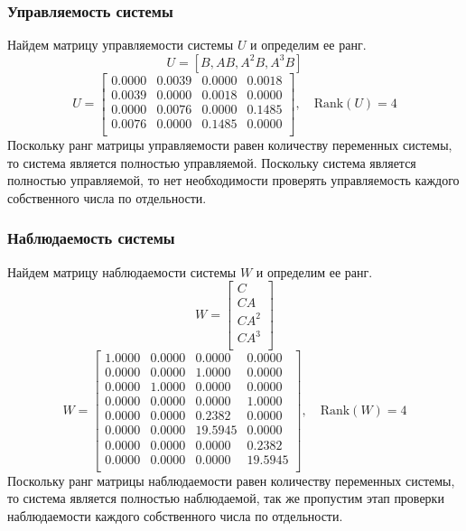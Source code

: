 \subsubsection{Управляемость системы}
Найдем матрицу управляемости системы $U$ и определим ее ранг. 
\begin{equation}
    U = [B, AB, A^2B, A^3B]
\end{equation}
\begin{equation}
    U = \begin{bmatrix}
    0.0000  & 0.0039  & 0.0000  & 0.0018 \\ 
    0.0039  & 0.0000  & 0.0018  & 0.0000 \\ 
    0.0000  & 0.0076  & 0.0000  & 0.1485 \\ 
    0.0076  & 0.0000  & 0.1485  & 0.0000 \\ 
    \end{bmatrix}, \quad \text{Rank}(U) = 4
    \label{eq:controlability_matrix}
\end{equation}
Поскольку ранг матрицы управляемости равен количеству переменных системы, то система является полностью управляемой. 
Поскольку система является полностью управляемой, то нет необходимости проверять управляемость каждого собственного 
числа по отдельности. 

\subsubsection{Наблюдаемость системы}
Найдем матрицу наблюдаемости системы $W$ и определим ее ранг.
\begin{equation}
    W = \begin{bmatrix}
    C \\ 
    CA \\ 
    CA^2 \\ 
    CA^3 \\ 
    \end{bmatrix}
\end{equation}
\begin{equation}
   W = \begin{bmatrix}
    1.0000  & 0.0000  & 0.0000  & 0.0000 \\ 
    0.0000  & 0.0000  & 1.0000  & 0.0000 \\ 
    0.0000  & 1.0000  & 0.0000  & 0.0000 \\ 
    0.0000  & 0.0000  & 0.0000  & 1.0000 \\ 
    0.0000  & 0.0000  & 0.2382  & 0.0000 \\ 
    0.0000  & 0.0000  & 19.5945  & 0.0000 \\ 
    0.0000  & 0.0000  & 0.0000  & 0.2382 \\ 
    0.0000  & 0.0000  & 0.0000  & 19.5945 \\
    \end{bmatrix}, \quad \text{Rank}(W) = 4
    \label{eq:observability_matrix}
\end{equation}
Поскольку ранг матрицы наблюдаемости равен количеству переменных системы, то система является полностью наблюдаемой, так же 
пропустим этап проверки наблюдаемости каждого собственного числа по отдельности. 

